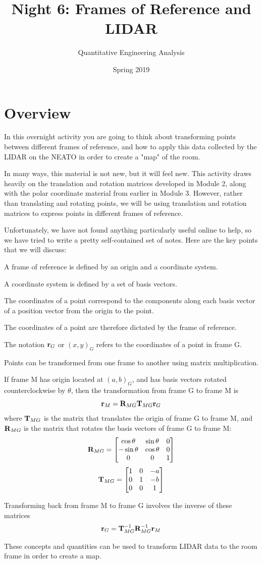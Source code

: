 \documentclass[M3_Night6_Solutions]{subfiles}
\title{Night 6: Frames of Reference and LIDAR}
\author{Quantitative Engineering Analysis}
\date{Spring 2019}
\begin{document}
\maketitle
\thispagestyle{firstpage}

\section{Overview}
In this overnight activity you are going to think about transforming points between different frames of reference, and how to apply this data collected by the LIDAR on the NEATO in order to create a "map" of the room.

In many ways, this material is not new, but it will feel new. This activity draws heavily on the translation and rotation matrices developed in Module 2, along with the polar coordinate material from earlier in Module 3. However, rather than translating and rotating points, we will be using translation and rotation matrices to express points in different frames of reference.

Unfortunately, we have not found anything particularly useful online to help, so we have tried to write a pretty self-contained set of notes. Here are the key points that we will discuss:

\begin{myboxi}
\bi
\item A frame of reference is defined by an origin and a coordinate system.
\item A coordinate system is defined by a set of basis vectors.
\item The coordinates of a point correspond to the components along each basis vector of a position vector from the origin to the point.
\item The coordinates of a point are therefore dictated by the frame of reference.
\item The notation $\mathbf{r}_G$ or $(x,y)_G$ refers to the coordinates of a point in frame G.
\item Points can be transformed from one frame to another using matrix multiplication.
\item If frame M has origin located at $(a,b)_G$, and has basis vectors rotated counterclockwise by $\theta$, then the transformation from frame G to frame M is
\[ \mathbf{r}_M = \mathbf{R}_{MG} \mathbf{T}_{MG} \mathbf{r}_G \]
where $\mathbf{T}_{MG}$ is the matrix that translates the origin of frame G to frame M, and $\mathbf{R}_{MG}$ is the matrix that rotates the basis vectors of frame G to frame M:
\[\mathbf{R}_{MG} = \begin{bmatrix} \cos \theta & \sin \theta & 0 \\ -\sin \theta & \cos \theta & 0 \\ 0 & 0 & 1 \end{bmatrix} \]
\[\mathbf{T}_{MG} = \begin{bmatrix} 1 & 0 & -a \\ 0 & 1 & -b \\ 0 & 0 & 1 \end{bmatrix} \]
\item Transforming back from frame M to frame G involves the inverse of these matrices
\[ \mathbf{r}_G = \mathbf{T}_{MG}^{-1} \mathbf{R}_{MG}^{-1} \mathbf{r}_M \]
\item These concepts and quantities can be used to transform LIDAR data to the room frame in order to create a map.
\ei
\end{myboxi}
\end{document}
